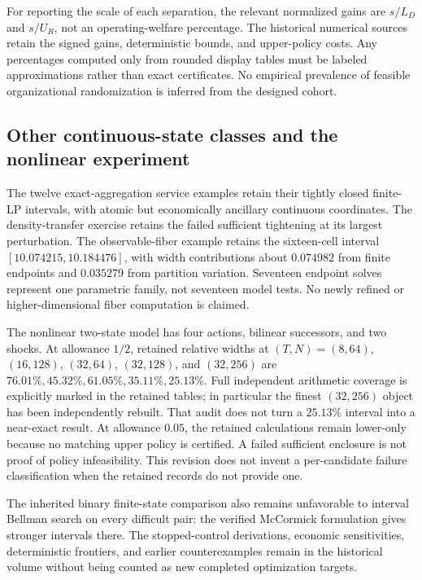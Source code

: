 For reporting the scale of each separation, the relevant normalized gains are $s/L_D$ and $s/U_R$, not an operating-welfare percentage. The historical numerical sources retain the signed gains, deterministic bounds, and upper-policy costs. Any percentages computed only from rounded display tables must be labeled approximations rather than exact certificates. No empirical prevalence of feasible organizational randomization is inferred from the designed cohort.

\subsection{Other continuous-state classes and the nonlinear experiment}
The twelve exact-aggregation service examples retain their tightly closed finite-LP intervals, with atomic but economically ancillary continuous coordinates. The density-transfer exercise retains the failed sufficient tightening at its largest perturbation. The observable-fiber example retains the sixteen-cell interval $[10.074215,10.184476]$, with width contributions about $0.074982$ from finite endpoints and $0.035279$ from partition variation. Seventeen endpoint solves represent one parametric family, not seventeen model tests. No newly refined or higher-dimensional fiber computation is claimed.

The nonlinear two-state model has four actions, bilinear successors, and two shocks. At allowance $1/2$, retained relative widths at $(T,N)=(8,64)$, $(16,128)$, $(32,64)$, $(32,128)$, and $(32,256)$ are $76.01\%,45.32\%,61.05\%,35.11\%,25.13\%$. Full independent arithmetic coverage is explicitly marked in the retained tables; in particular the finest $(32,256)$ object has been independently rebuilt. That audit does not turn a $25.13\%$ interval into a near-exact result. At allowance $0.05$, the retained calculations remain lower-only because no matching upper policy is certified. A failed sufficient enclosure is not proof of policy infeasibility. This revision does not invent a per-candidate failure classification when the retained records do not provide one.

The inherited binary finite-state comparison also remains unfavorable to interval Bellman search on every difficult pair: the verified McCormick formulation gives stronger intervals there. The stopped-control derivations, economic sensitivities, deterministic frontiers, and earlier counterexamples remain in the historical volume without being counted as new completed optimization targets.

